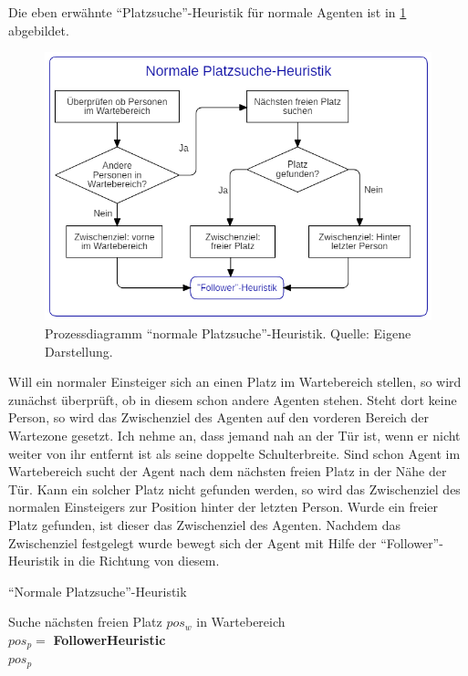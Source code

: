 Die eben erwähnte "`Platzsuche"'-Heuristik für normale Agenten ist in \figurename \ref{fig:NPH} abgebildet.
\begin{figure}[H]
	\centering
		\includegraphics[width=1.0\textwidth]{pictures/model/algorithm/boarding/normal_boarding/normal_space_find_heuristic.png}
	\caption{Prozessdiagramm "`normale Platzsuche"'-Heuristik. Quelle: Eigene Darstellung.}
	\label{fig:NPH}
\end{figure}
Will ein normaler Einsteiger sich an einen Platz im Wartebereich stellen, so wird zunächst überprüft, ob in diesem schon andere Agenten stehen. Steht dort keine Person, so wird das Zwischenziel des Agenten auf den vorderen Bereich der Wartezone gesetzt. Ich nehme an, dass jemand nah an der Tür ist, wenn er nicht weiter von ihr entfernt ist als seine doppelte Schulterbreite. Sind schon Agent im Wartebereich sucht der Agent nach dem nächsten freien Platz in der Nähe der Tür. Kann ein solcher Platz nicht gefunden werden, so wird das Zwischenziel des normalen Einsteigers zur Position hinter der letzten Person. Wurde ein freier Platz gefunden, ist dieser das Zwischenziel des Agenten. Nachdem das Zwischenziel festgelegt wurde bewegt sich der Agent mit Hilfe der "`Follower"'-Heuristik in die Richtung von diesem.
\clearpage
\begin{algorithm} [H]
	\caption{"`Normale Platzsuche"'-Heuristik}
	
	\normalSpaceFindHeuristic{} {
		 {
			Suche nächsten freien Platz $pos_w$ in Wartebereich \\
		} 
		$pos_p = $ \textbf{FollowerHeuristic} \\
		\Return $pos_p$
	}
\end{algorithm}

